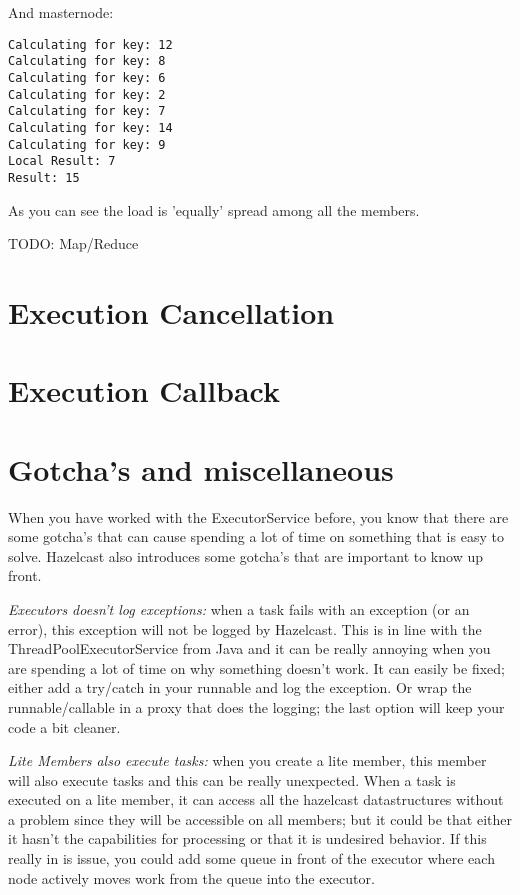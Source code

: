And masternode:
\begin{verbatim}
Calculating for key: 12
Calculating for key: 8
Calculating for key: 6
Calculating for key: 2
Calculating for key: 7
Calculating for key: 14
Calculating for key: 9
Local Result: 7
Result: 15
\end{verbatim}

As you can see the load is 'equally' spread among all the members. 

TODO: Map/Reduce

\section{Execution Cancellation}

\section{Execution Callback}

\section{Gotcha's and miscellaneous}
When you have worked with the ExecutorService before, you know that there are some gotcha's that can cause spending a lot of time on something that is easy to solve. Hazelcast also introduces some gotcha's that are important to know up front.

\emph{Executors doesn't log exceptions:} when a task fails with an exception (or an error), this exception will not be logged by Hazelcast. This is in line with the ThreadPoolExecutorService from Java and it can be really annoying when you are spending a lot of time on why something doesn't work. It can easily be fixed; either add a try/catch in your runnable and log the exception. Or wrap the runnable/callable in a proxy that does the logging; the last option will keep your code a bit cleaner. 

\emph{Lite Members also execute tasks:} when you create a lite member, this member will also execute tasks and this can be really unexpected. When a task is executed on a lite member, it can access all the hazelcast datastructures without a problem since they will be accessible on all members; but it could be that either it hasn't the capabilities for processing or that it is undesired behavior. If this really in is issue, you could add some queue in front of the executor where each node actively moves work from the queue into the executor.

